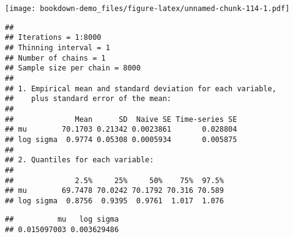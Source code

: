 \documentclass[
]{book}
\newenvironment{Shaded}{\begin{snugshade}}{\end{snugshade}}
\newcommand{\AttributeTok}[1]{\textcolor[rgb]{0.77,0.63,0.00}{#1}}
\newcommand{\DecValTok}[1]{\textcolor[rgb]{0.00,0.00,0.81}{#1}}
\newcommand{\FloatTok}[1]{\textcolor[rgb]{0.00,0.00,0.81}{#1}}
\newcommand{\FunctionTok}[1]{\textcolor[rgb]{0.00,0.00,0.00}{#1}}
\newcommand{\NormalTok}[1]{#1}
\newcommand{\OtherTok}[1]{\textcolor[rgb]{0.56,0.35,0.01}{#1}}
\newcommand{\SpecialCharTok}[1]{\textcolor[rgb]{0.00,0.00,0.00}{#1}}
\begin{document}
\texttt{[image: bookdown-demo\_files/figure-latex/unnamed-chunk-114-1.pdf]}

\begin{Shaded}
\end{Shaded}

\begin{verbatim}
## 
## Iterations = 1:8000
## Thinning interval = 1 
## Number of chains = 1 
## Sample size per chain = 8000 
## 
## 1. Empirical mean and standard deviation for each variable,
##    plus standard error of the mean:
## 
##              Mean      SD  Naive SE Time-series SE
## mu        70.1703 0.21342 0.0023861       0.028804
## log sigma  0.9774 0.05308 0.0005934       0.005875
## 
## 2. Quantiles for each variable:
## 
##              2.5%     25%     50%    75%  97.5%
## mu        69.7478 70.0242 70.1792 70.316 70.589
## log sigma  0.8756  0.9395  0.9761  1.017  1.076
\end{verbatim}

\begin{Shaded}
\end{Shaded}

\begin{verbatim}
##          mu   log sigma 
## 0.015097003 0.003629486
\end{verbatim}

\begin{Shaded}
\end{Shaded}
\end{document}
